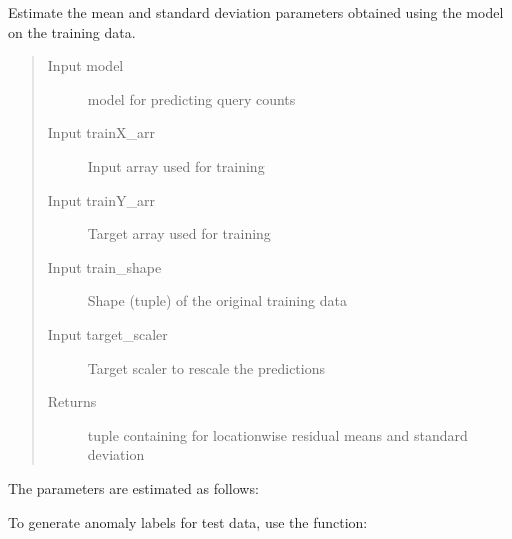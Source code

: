 \documentclass[letterpaper,10pt,english]{sphinxmanual}
\begin{document}
\begin{fulllineitems}
\label{\detokenize{manual:dnspredict.estimateADParams}}
Estimate the mean and standard deviation parameters obtained using the model on 
the training data.
\begin{quote}\begin{description}
\item[{Input model}] \leavevmode
{} model for predicting query counts

\item[{Input trainX\_arr}] \leavevmode
Input  array used for training

\item[{Input trainY\_arr}] \leavevmode
Target  array used for training

\item[{Input train\_shape}] \leavevmode
Shape (tuple) of the original training data

\item[{Input target\_scaler}] \leavevmode
Target scaler to rescale the predictions

\item[{Returns}] \leavevmode
tuple containing  for location\sphinxhyphen{}wise residual means and standard deviation

\end{description}\end{quote}

\end{fulllineitems}


The parameters are estimated as follows:

\begin{sphinxVerbatim}[commandchars=\\\{\}]
  \PYG{p}{[}\PYG{p}{]}
\end{sphinxVerbatim}

To generate anomaly labels for test data, use the  function:
\end{document}
